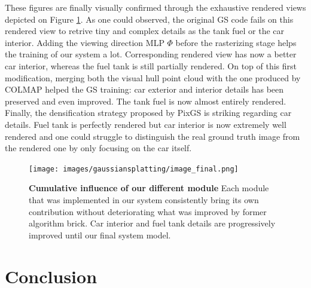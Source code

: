 These figures are finally visually confirmed through the exhaustive rendered views depicted on Figure \ref{fig:gs-vh-result}. As one could observed, the original GS code fails on this rendered view to retrive tiny and complex details as the tank fuel or the car interior. Adding the viewing direction MLP $\Phi$ before the rasterizing stage helps the training of our system a lot. Corresponding rendered view has now a better car interior, whereas the fuel tank is still partially rendered. On top of this first modification, merging both the visual hull point cloud with the one produced by COLMAP helped the GS training: car exterior and interior details has been preserved and even improved. The tank fuel is now almost entirely rendered. Finally, the densification strategy proposed by PixGS is striking regarding car details. Fuel tank is perfectly rendered but car interior is now extremely well rendered and one could struggle to distinguish the real ground truth image from the rendered one by only focusing on the car itself.   



\begin{figure}[htb!]
  \center
\texttt{[image: images/gaussiansplatting/image\_final.png]}
\caption{\textbf{Cumulative influence of our different module} Each module that was implemented in our system consistently bring its own contribution without deteriorating what was improved by former algorithm brick. Car interior and fuel tank details are progressively improved until our final system model.}
\label{fig:gs-vh-result}
\end{figure}



\section{Conclusion}






